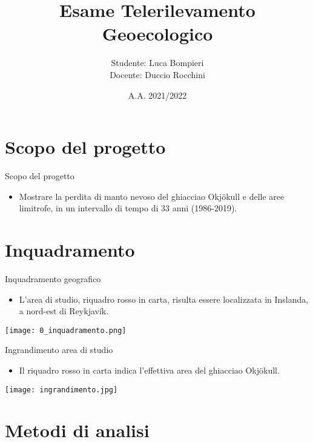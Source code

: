 \documentclass{beamer}
\title{Esame Telerilevamento Geoecologico}
\institute{Alma Mater Studiorum - Università di Bologna\\Telerilevamento Geo-Ecologico}
\author{Studente: Luca Bompieri\\Docente: Duccio Rocchini}
\date{A.A. 2021/2022}
\begin{document}
\maketitle



\section{Scopo del progetto}

\begin{frame}{Scopo del progetto}
\begin{itemize}
    \item  Mostrare la perdita di manto nevoso del ghiacciao Okjökull e delle aree limitrofe, in un intervallo di tempo di 33 anni (1986-2019).
\end{itemize}
\end{frame}

\section{Inquadramento}

\begin{frame}{Inquadramento geografico}
\begin{itemize}
    \item L'area di studio, riquadro rosso in carta, risulta essere localizzata in Inslanda, a nord-est di Reykjavík. 
\end{itemize}
    \texttt{[image: 0\_inquadramento.png]}
    \centering
\end{frame}

\begin{frame}{Ingrandimento area di studio}
\begin{itemize}
    \item Il riquadro rosso in carta indica l'effettiva area del  ghiacciao Okjökull. 
\end{itemize}
    \texttt{[image: ingrandimento.jpg]}
    \centering
\end{frame}

\section{Metodi di analisi}
\end{document}
